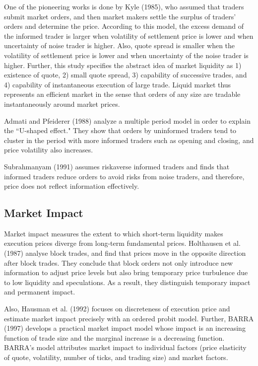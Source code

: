 One of the pioneering works is done by Kyle (1985), who assumed that traders submit market orders, and then market makers settle the surplus of traders' orders and determine the price.  According to this model, the excess demand of the informed trader is larger when volatility of settlement price is lower and when uncertainty of noise trader is higher.  Also, quote spread is smaller when the volatility of settlement price is lower and when uncertainty of the noise trader is higher.  Further, this study specifies the abstract idea of market liquidity as 1) existence of quote, 2) small quote spread, 3) capability of successive trades, and 4) capability of instantaneous execution of large trade.  Liquid market thus represents an efficient market in the sense that orders of any size are tradable instantaneously around market prices.

Admati and Pfeiderer (1988) analyze a multiple period model in order to explain the ``U-shaped effect."  They show that orders by uninformed traders tend to cluster in the period with more informed traders such as opening and closing, and price volatility also increases.  

Subrahmanyam (1991) assumes riskaverse informed traders and finds that informed traders reduce orders to avoid risks from noise traders, and therefore, price does not reflect information effectively.

\subsection{Market Impact}\label{subsec_r22}
Market impact measures the extent to which short-term liquidity makes execution prices diverge from long-term fundamental prices. Holthausen et al. (1987) analyse block trades, and find that prices move in the opposite direction after block trades.  They conclude that block orders not only introduce new information to adjust price levels but also bring temporary price turbulence due to low liquidity and speculations.  As a result, they distinguish temporary impact and permanent impact.  

Also, Hausman et al. (1992) focuses on discreteness of execution price and estimate market impact precisely with an ordered probit model.  Further, BARRA (1997) develops a practical market impact model whose impact is an increasing function of trade size and the marginal increase is a decreasing function.  BARRA's model attributes market impact to individual factors (price elasticity of quote, volatility, number of ticks, and trading size) and market factors.

